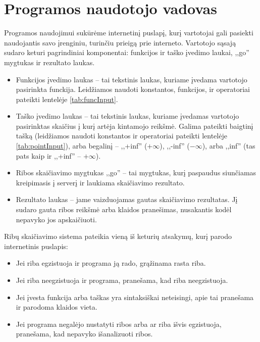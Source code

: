 \section{Programos naudotojo vadovas}

	Programos naudojimui sukūrėme internetinį puslapį, kurį vartotojai gali pasiekti 
	naudojantis savo įrenginiu, turinčiu prieigą prie interneto.
	Vartotojo sąsają sudaro keturi pagrindiniai komponentai: funkcijos ir taško įvedimo laukai, ,,go'' mygtukas ir rezultato laukas.
	
	\begin{itemize}
		\item Funkcijos įvedimo laukas -- tai tekstinis laukas, kuriame įvedama vartotojo pasirinkta funckija. Leidžiamos
			naudoti konstantos, funkcijos, ir operatoriai pateikti lentelėje \ref{tab:funcInput}.
		\item Taško įvedimo laukas -- tai tekstinis laukas, kuriame įvedamas vartotojo pasirinktas skaičius į kurį artėja
			kintamojo reikšmė. Galima pateikti baigtinį tašką (leidžiamos naudoti konstantos ir operatoriai pateikti
			lentelėje \ref{tab:pointInput}), arba begalinį -- ,,+inf'' ($+\infty$), ,,-inf'' ($-\infty$), arba ,,inf''
			(tas pats kaip ir ,,+inf'' -- $+\infty$).
		\item Ribos skaičiavimo mygtukas ,,go'' -- tai mygtukas, kurį paspaudus siunčiamas kreipimasis į serverį ir laukiama skaičiavimo rezultato.
		\item Rezultato laukas -- jame vaizduojamas gautas skaičiavimo rezultatas. 
		Jį sudaro gauta ribos reikšmė arba klaidos pranešimas, nusakantis kodėl nepavyko jos apskaičiuoti.
	\end{itemize}
	
	Ribų skaičiavimo sistema pateikia vieną iš keturių atsakymų, kurį parodo internetinis puslapis:

	\begin{itemize}
		\item Jei riba egzistuoja ir programa ją rado, grąžinama rasta riba.
		\item Jei riba neegzistuoja ir programa, pranešama, kad riba neegzistuoja.
		\item Jei įvesta funkcija arba taškas yra sintaksiškai neteisingi, apie tai pranešama ir parodoma klaidos vieta.
		\item Jei programa negalėjo nustatyti ribos arba ar riba išvis egzistuoja, pranešama, kad nepavyko išanalizuoti ribos.
	\end{itemize}
	
